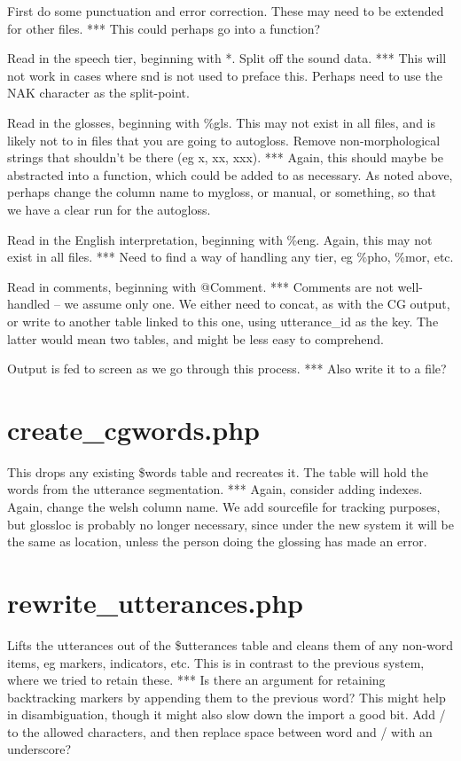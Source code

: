 \documentclass[a4paper,10pt]{article}
\begin{document}
First do some punctuation and error correction.  These may need to be extended for other files.
*** This could perhaps go into a function? 

Read in the speech tier, beginning with *.  Split off the sound data.
*** This will not work in cases where snd is not used to preface this.  Perhaps need to use the NAK character as the split-point.

Read in the glosses, beginning with \%gls.  This may not exist in all files, and is likely not to in files that you are going to autogloss.  Remove non-morphological strings that shouldn't be there (eg x, xx, xxx).
*** Again, this should maybe be abstracted into a function, which could be added to as necessary.  As noted above, perhaps change the column name to mygloss, or manual, or something, so that we have a clear run for the autogloss.

Read in the English interpretation, beginning with \%eng.  Again, this may not exist in all files.
*** Need to find a way of handling any tier, eg \%pho, \%mor, etc.   

Read in comments, beginning with @Comment.  
*** Comments are not well-handled -- we assume only one.  We either need to concat, as with the CG output, or write to another table linked to this one, using utterance\_id as the key.  The latter would mean two tables, and might be less easy to comprehend.

Output is fed to screen as we go through this process.
*** Also write it to a file?


\section{create\_cgwords.php}
\label{sec:words}

This drops any existing \$words table and recreates it.  The table will hold the words from the utterance segmentation.
*** Again, consider adding indexes.  Again, change the welsh column name.  We add sourcefile for tracking purposes, but glossloc is probably no longer necessary, since under the new system it will be the same as location, unless the person doing the glossing has made an error.


\section{rewrite\_utterances.php}
\label{sec:rewrite}

Lifts the utterances out of the \$utterances table and cleans them of any non-word items, eg markers, indicators, etc.  This is in contrast to the previous system, where we tried to retain these.
*** Is there an argument for retaining backtracking markers by appending them to the previous word?  This might help in disambiguation, though it might also slow down the import a good bit.  Add / to the allowed characters, and then replace space between word and / with an underscore?
\end{document}
